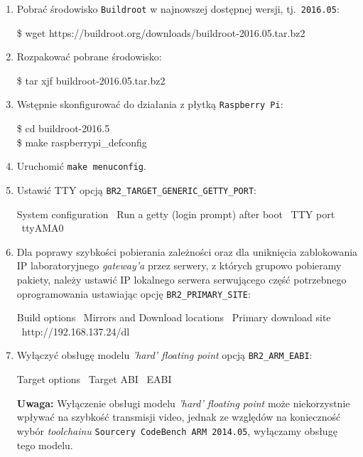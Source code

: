 \documentclass{article}
\newcommand{\buildrootver}{2016.05}
\newenvironment{ttblock}{\ttfamily}{\par}
\begin{document}
\begin{enumerate}
\item Pobrać środowisko \texttt{Buildroot} w najnowszej dostępnej wersji, tj.~\texttt{\buildrootver}:

\begin{ttblock}
\$ wget https://buildroot.org/downloads/buildroot-\buildrootver.tar.bz2
\end{ttblock}

\item Rozpakować pobrane środowisko:

\begin{ttblock}
\$ tar xjf buildroot-\buildrootver.tar.bz2
\end{ttblock}

\item Wstępnie skonfigurować do działania z płytką \texttt{Raspberry~Pi}:

\begin{ttblock}
\$ cd buildroot-2016.5\\
\$ make raspberrypi\_defconfig
\end{ttblock}

\item Uruchomić \texttt{make menuconfig}.

\item Ustawić TTY opcją \texttt{BR2\_TARGET\_GENERIC\_GETTY\_PORT}:

\begin{ttblock}
System configuration \textrightarrow\ Run a getty (login prompt) after boot \textrightarrow\ TTY port \textrightarrow\ ttyAMA0
\end{ttblock}

\item Dla poprawy szybkości pobierania zależności oraz dla uniknięcia zablokowania IP laboratoryjnego \emph{gateway'a} przez serwery, z których grupowo pobieramy pakiety, należy ustawić IP lokalnego serwera serwującego część potrzebnego oprogramowania ustawiając opcję \texttt{BR2\_PRIMARY\_SITE}:

\begin{ttblock}
Build options \textrightarrow\ Mirrors and Download locations \textrightarrow\ Primary download site \textrightarrow\ http://192.168.137.24/dl
\end{ttblock}

\item Wyłączyć obsługę modelu \emph{'hard' floating point} opcją \texttt{BR2\_ARM\_EABI}:

\begin{ttblock}
Target options \textrightarrow\ Target ABI \textrightarrow\ EABI
\end{ttblock}
\textbf{Uwaga:} Wyłączenie obsługi modelu \emph{'hard' floating point} może niekorzystnie wpływać na szybkość transmisji video, jednak ze względów na konieczność wybór \emph{toolchainu} \texttt{Sourcery CodeBench ARM 2014.05}, wyłączamy obsługę tego modelu.


\end{enumerate}
\end{document}
